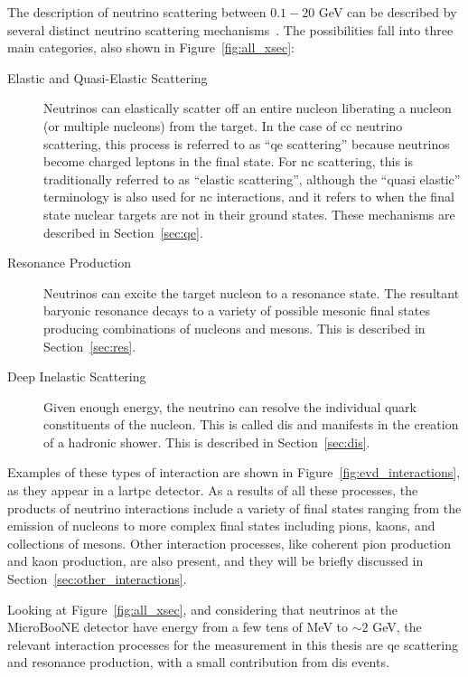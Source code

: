 The description of neutrino scattering between $0.1 - 20$ GeV can be described by several distinct neutrino scattering mechanisms~\cite{zeller}. The possibilities fall into three main categories, also shown in Figure~\ref{fig:all_xsec}:
\begin{description}
\item[Elastic and Quasi-Elastic Scattering] Neutrinos can elastically scatter off an entire nucleon liberating a nucleon (or multiple nucleons) from the target. In the case of \acrshort{cc} neutrino scattering, this process is referred to as ``\acrshort{qe} scattering'' because neutrinos become charged leptons in the final state. For \acrshort{nc} scattering, this is traditionally referred to as ``elastic scattering'', although the ``quasi elastic'' terminology is also used for \acrshort{nc} interactions, and it refers to when the final state nuclear targets are not in their ground states.
These mechanisms are described in Section~\ref{sec:qe}. 
\item[Resonance Production] Neutrinos can excite the target nucleon to a resonance state. The resultant baryonic resonance decays to a variety of possible mesonic final states producing combinations of nucleons and mesons. This is described in Section~\ref{sec:res}.
\item[Deep Inelastic Scattering] Given enough energy, the neutrino can resolve the individual quark constituents of the nucleon. This is called \acrfull{dis} and manifests in the creation of a hadronic shower. This is described in Section~\ref{sec:dis}.
\end{description}
Examples of these types of interaction are shown in Figure~\ref{fig:evd_interactions}, as they appear in a \acrshort{lartpc} detector.
As a results of all these processes, the products of neutrino interactions include a variety of final states ranging from the emission of nucleons to more complex final states including pions, kaons, and collections of mesons.
Other interaction processes, like coherent pion production and kaon production, are also present, and they will be briefly discussed in Section~\ref{sec:other_interactions}.

Looking at Figure~\ref{fig:all_xsec}, and considering that neutrinos at the MicroBooNE detector have energy from a few tens of MeV to $\sim 2$ GeV, the relevant interaction processes for the measurement in this thesis are \acrshort{qe} scattering and resonance production, with a small contribution from \acrshort{dis} events.

